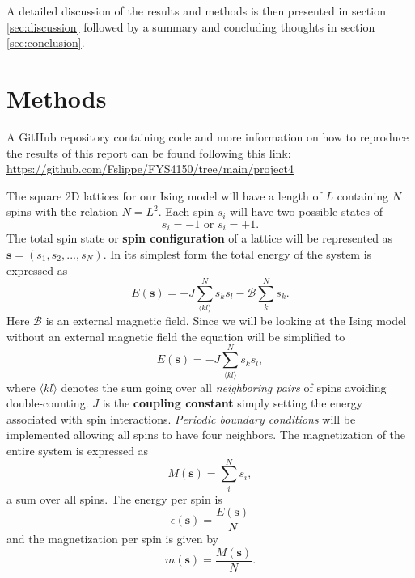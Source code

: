 \documentclass[english,notitlepage,reprint,nofootinbib]{revtex4-1}  %
\begin{document}
A detailed discussion of the results and methods is then presented in section \ref{sec:discussion} followed by a summary and concluding thoughts in section \ref{sec:conclusion}.

\section{Methods}\label{sec:methods}
A GitHub repository containing code and more information on how to reproduce the results of this report can be found following this link:
\url{https://github.com/Fslippe/FYS4150/tree/main/project4}


The square 2D lattices for our Ising model will have a length of $L$ containing $N$ spins with the relation $N = L^2$. Each spin $s_i$ will have two possible states of
\begin{equation*}
    s_i = -1 \text{ or } s_i = +1.
\end{equation*}
The total spin state or \textbf{spin configuration} of a lattice will be represented as $\textbf{s} = (s_1, s_2, ..., s_N)$. In its simplest form the total energy of the system is expressed as
\begin{equation*}
    E(\textbf{s}) = - J \sum^N_{\langle kl \rangle} s_k s_l - \mathscr{B} \sum^N_{k} s_k.
\end{equation*}
Here $\mathscr{B}$ is an external magnetic field. Since we will be looking at the Ising model without an external magnetic field the equation will be simplified to
\begin{equation}
    E(\textbf{s}) = - J \sum^N_{\langle kl \rangle} s_k s_l,
\end{equation}
where $\langle kl \rangle$ denotes the sum going over all \textit{neighboring pairs} of spins avoiding double-counting. $J$ is the \textbf{coupling constant} simply setting the energy associated with spin interactions. \textit{Periodic boundary conditions} will be implemented allowing all spins to have four neighbors. The magnetization of the entire system is expressed as
\begin{equation}
    M(\textbf{s}) = \sum^N_i s_i,
\end{equation}
a sum over all spins. The energy per spin is
\begin{equation}
    \epsilon(\textbf{s}) = \frac{E(\textbf{s})}{N} \label{eq:mean_E}
\end{equation}
and the magnetization per spin is given by
\begin{equation}
    m(\textbf{s}) = \frac{M(\textbf{s})}{N}. \label{eq:mean_M}
\end{equation}
\end{document}
